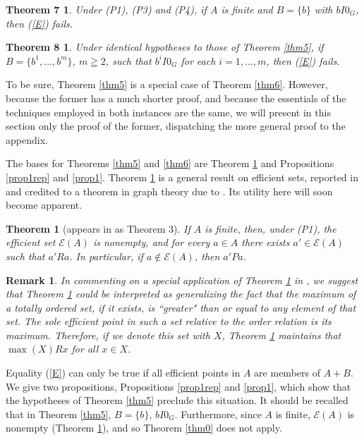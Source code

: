 \documentclass[pdflatex,sn-apa,11pt]{sn-jnl}%
\newtheorem{theorem}{Theorem}%
\newtheorem*{theoremfive}{Theorem 7}
\newtheorem*{theoremsix}{Theorem 8}
\newtheorem{remark}{Remark}%
\begin{document}
\begin{theoremfive}
Under (P1), (P3) and (P4), if $A$ is finite and $B = \{b\}$ with $bI0_G$, then (\ref{E}) fails.
\end{theoremfive}

\begin{theoremsix}
Under identical hypotheses to those of Theorem \ref{thm5}, if $B = \{b^{1}, ..., b^{m}\}$, $m \geqq 2$, such that $b^{i}I0_G$ for each $i = 1, ..., m$, then (\ref{E}) fails.
\end{theoremsix}

To be sure, Theorem \ref{thm5} is a special case of Theorem \ref{thm6}. However, because the former has a much shorter proof, and because the essentials of the techniques employed in both instances are the same, we will present in this section only the proof of the former, dispatching the more general proof to the appendix. %

The bases for Theorems \ref{thm5} and \ref{thm6} are Theorem \ref{thm4} and Propositions \ref{prop1rep} and \ref{prop1}. Theorem \ref{thm4} is a general result on efficient sets, reported in \cite{white1977kernels} and credited to a theorem in graph theory due to \cite{berge1985graphs}. Its utility here will soon become apparent.

\begin{theorem}[appears in \cite{white1977kernels} as Theorem 3]
\label{thm4}
If $A$ is finite, then, under (P1), the efficient set $\mathscr{E}(A)$ is nonempty, and for every $a \in A$ there exists $a' \in \mathscr{E}(A)$ such that $a'Ra$. In particular, if $a \notin \mathscr{E}(A)$, then $a'Pa$.
\end{theorem}

\begin{remark}In commenting on a special application of Theorem \ref{thm4} in \cite{mifrani2025counterexample}, we suggest that Theorem \ref{thm4} could be interpreted as generalizing the fact that the maximum of a totally ordered set, if it exists, is ``greater" than or equal to any element of that set. The sole efficient point in such a set relative to the order relation is its maximum. Therefore, if we denote this set with $X$, Theorem \ref{thm4} maintains that $\max(X)Rx$ for all $x \in X$.\end{remark}

Equality (\ref{E}) can only be true if all efficient points in $A$ are members of $A+B$. We give two propositions, Propositions \ref{prop1rep} and \ref{prop1}, which show that the hypotheses of Theorem \ref{thm5} preclude this situation. It should be recalled that in Theorem \ref{thm5}, $B = \{b\}$, $bI0_{G}$. Furthermore, since $A$ is finite, $\mathscr{E}(A)$ is nonempty (Theorem \ref{thm4}), and so Theorem \ref{thm0} does not apply. %
\end{document}

